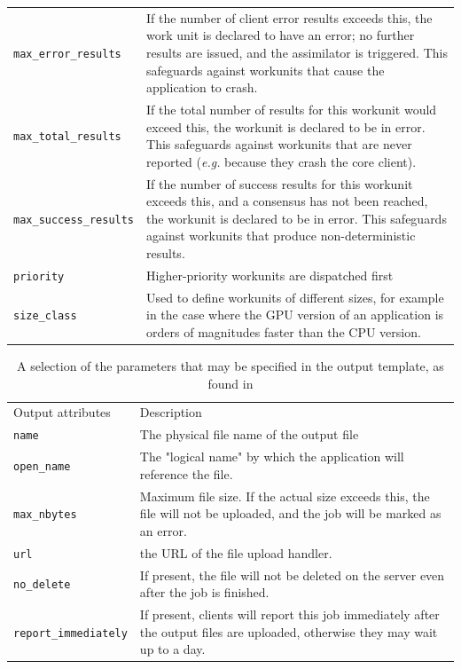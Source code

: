 \begin{table}
\begin{tabular}{lp{11.5cm}}
\verb|max_error_results| &
If the number of client error results exceeds this, the work unit is declared to have an error; no further results are issued, and the assimilator is triggered. This safeguards against workunits that cause the application to crash.
\\
\verb|max_total_results| & If the total number of results for this workunit would exceed this, the workunit is declared to be in error. This safeguards against workunits that are never reported (\emph{e.g.} because they crash the core client).
\\
\verb|max_success_results| & If the number of success results for this workunit exceeds this, and a consensus has not been reached, the workunit is declared to be in error. This safeguards against workunits that produce non-deterministic results.
\\
\verb|priority| &  Higher-priority workunits are dispatched first \\
\verb|size_class| & Used to define workunits of different sizes, for example in the case where the GPU version of an application is orders of magnitudes faster than the CPU version. \\ \bottomrule
\end{tabular} \label{tab:intemplate}
\end{table}

\begin{table} 
\caption{A selection of the parameters that may be specified in the output template, as found in \cite{boincwiki}}
\begin{tabular}{lp{11.6cm}}\toprule
Output attributes & Description \cite{boincwiki}    \\ \cmidrule(r){1-2}
 \verb|name| & The physical file name of the output file\\
\verb|open_name| & The "logical name" by which the application will reference the file.\\
\verb|max_nbytes| & Maximum file size. If the actual size exceeds this, the file will not be uploaded, and the job will be marked as an error.\\
\verb|url| & the URL of the file upload handler. \\ 
\verb|no_delete| & If present, the file will not be deleted on the server even after the job is finished.\\
\verb|report_immediately| & If present, clients will report this job immediately after the output files are uploaded, otherwise they may wait up to a day. 
\\  \bottomrule
\end{tabular}\label{tab:outtemplate}
\end{table}

